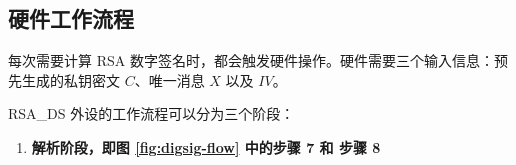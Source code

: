 \documentclass[main\_\_CN.tex]{subfiles}
\begin{document}
\subsection{硬件工作流程}
\label{sec:digsig-hardware-level-operation}

每次需要计算 RSA 数字签名时，都会触发硬件操作。硬件需要三个输入信息：预先生成的私钥密文 \begin{math}C\end{math}、唯一消息 \begin{math}X\end{math} 以及 \begin{math}IV\end{math}。

RSA\_DS 外设的工作流程可以分为三个阶段：

\begin{enumerate}

    \item {\bfseries 解析阶段，即图 \ref{fig:digsig-flow} 中的步骤 7 和 步骤 8}


\end{enumerate}
\end{document}
